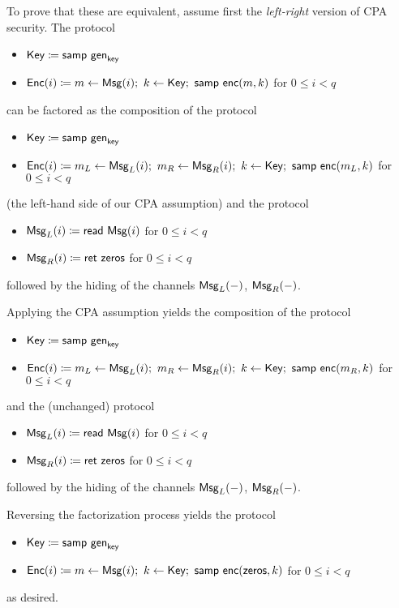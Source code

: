 \noindent To prove that these are equivalent, assume first the \emph{left-right} version of CPA security. The protocol
\begin{itemize}
\item $\mathsf{Key} \coloneqq \mathsf{samp} \ \mathsf{gen}_{\mathsf{key}}$
\item $\mathsf{Enc}(i) \coloneqq m \leftarrow \mathsf{Msg}(i); \ k \leftarrow \mathsf{Key}; \ \mathsf{samp} \ \mathsf{enc}(m,k)$ for $0 \leq i < q$
\end{itemize}
can be factored as the composition of the protocol
\begin{itemize}
\item $\mathsf{Key} \coloneqq \mathsf{samp} \ \mathsf{gen}_{\mathsf{key}}$
\item $\Enc(i) \coloneqq m_L \leftarrow \MsgL(i); \ m_R \leftarrow \MsgR(i); \ k \leftarrow \Key; \ \samp{\enc(m_L,k)}$ for $0 \leq i < q$
\end{itemize}
(the left-hand side of our CPA assumption) and the protocol
\begin{itemize}
\item $\mathsf{Msg}_L(i) \coloneqq \mathsf{read} \ \mathsf{Msg}(i)$ for $0 \leq i < q$
\item $\mathsf{Msg}_R(i) \coloneqq \mathsf{ret} \ \mathsf{zeros}$ for $0 \leq i < q$
\end{itemize}
followed by the hiding of the channels $\mathsf{Msg}_L(-)$, $\mathsf{Msg}_R(-)$.

Applying the CPA assumption yields the composition of the protocol
\begin{itemize}
\item $\mathsf{Key} \coloneqq \mathsf{samp} \ \mathsf{gen}_{\mathsf{key}}$
\item $\Enc(i) \coloneqq m_L \leftarrow \MsgL(i); \ m_R \leftarrow \MsgR(i); \ k \leftarrow \Key; \ \samp{\enc(m_R,k)}$ for $0 \leq i < q$
\end{itemize}
and the (unchanged) protocol
\begin{itemize}
\item $\mathsf{Msg}_L(i) \coloneqq \mathsf{read} \ \mathsf{Msg}(i)$ for $0 \leq i < q$
\item $\mathsf{Msg}_R(i) \coloneqq \mathsf{ret} \ \mathsf{zeros}$ for $0 \leq i < q$
\end{itemize}
followed by the hiding of the channels $\mathsf{Msg}_L(-)$, $\mathsf{Msg}_R(-)$. 

Reversing the factorization process yields the protocol
\begin{itemize}
\item $\mathsf{Key} \coloneqq \mathsf{samp} \ \mathsf{gen}_{\mathsf{key}}$
\item $\mathsf{Enc}(i) \coloneqq m \leftarrow \mathsf{Msg}(i); \ k \leftarrow \mathsf{Key}; \ \mathsf{samp} \ \mathsf{enc}(\mathsf{zeros},k)$ for $0 \leq i < q$
\end{itemize}
as desired.

